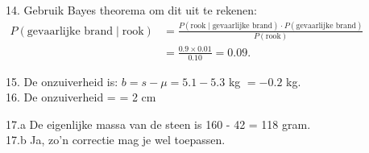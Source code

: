 14. Gebruik Bayes theorema om dit uit te rekenen:\\
$\begin{aligned}
    \displaystyle 
      P(\text{gevaarlijke brand} \mid \text{rook}) 
      & = \frac{P(\text{rook} \mid \text{gevaarlijke brand})\cdot P(\text{gevaarlijke brand})}{P(\text{rook})} \\
      & = \frac{0.9 \times 0.01}{0.10} = 0.09.
\end{aligned}$


15. De onzuiverheid is: $b = s - \mu = 5.1 - 5.3$ kg $= -0.2$ kg. \\


16. De onzuiverheid  = = 2 cm


17.a De eigenlijke massa van de steen is 160 - 42 = 118 gram.\\
17.b Ja, zo'n correctie mag je wel toepassen.

